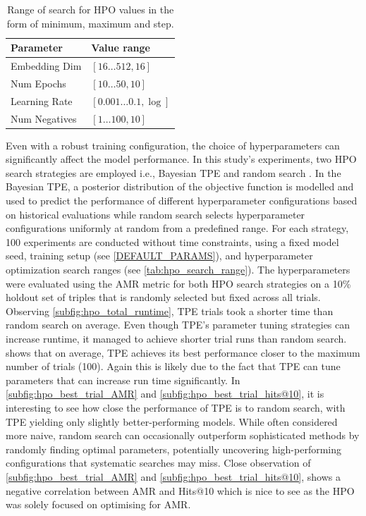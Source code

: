 \begin{table}[t]
    \centering
    \begin{tabular}{ll}
    \hline \hline \textbf{Parameter} & \textbf{Value range} \bigstrut \\
    \hline Embedding Dim & {$[16 \ldots 512,16]$} \bigstrut \\
    Num Epochs & {$[10 \ldots 50,10]$} \bigstrut \\
    Learning Rate & {$[0.001 \ldots 0.1, \log ]$} \bigstrut \\
    Num Negatives & {$[1 \ldots 100,10]$} \bigstrut \\
    \hline
    \end{tabular}
    \caption{Range of search for \ac{HPO} values in the form of minimum, maximum and step.}
    \label{tab:hpo_search_range}
\end{table}

\noindent Even with a robust training configuration, the choice of hyperparameters can significantly affect the model performance. In this study's experiments, two \ac{HPO} search strategies are employed i.e., Bayesian \ac{TPE} \citep{Bergstra2011AlgorithmsOptimization} and random search \citep{Bergstra2012RandomOptimization}. In the Bayesian \ac{TPE}, a posterior distribution of the objective function is modelled and used to predict the performance of different hyperparameter configurations based on historical evaluations while random search selects hyperparameter configurations uniformly at random from a predefined range. For each strategy, 100 experiments are conducted without time constraints, using a fixed model seed, training setup (see \autoref{DEFAULT_PARAMS}), and hyperparameter optimization search ranges (see \autoref{tab:hpo_search_range}). The hyperparameters were evaluated using the AMR metric for both \ac{HPO} search strategies on a 10\% holdout set of triples that is randomly selected but fixed across all trials. Observing \autoref{subfig:hpo_total_runtime}, \ac{TPE} trials took a shorter time than random search on average. Even though \ac{TPE}'s parameter tuning strategies can increase runtime, it managed to achieve shorter trial runs than random search.  shows that on average, \ac{TPE} achieves its best performance closer to the maximum number of trials (100). Again this is likely due to the fact that \ac{TPE} can tune parameters that can increase run time significantly. In \autoref{subfig:hpo_best_trial_AMR} and \autoref{subfig:hpo_best_trial_hits@10}, it is interesting to see how close the performance of \ac{TPE} is to random search, with \ac{TPE} yielding only slightly better-performing models. While often considered more naive, random search can occasionally outperform sophisticated methods by randomly finding optimal parameters, potentially uncovering high-performing configurations that systematic searches may miss. Close observation of \autoref{subfig:hpo_best_trial_AMR} and \autoref{subfig:hpo_best_trial_hits@10}, shows a negative correlation between \ac{AMR} and Hits@10 which is nice to see as the \ac{HPO} was solely focused on optimising for \ac{AMR}.

